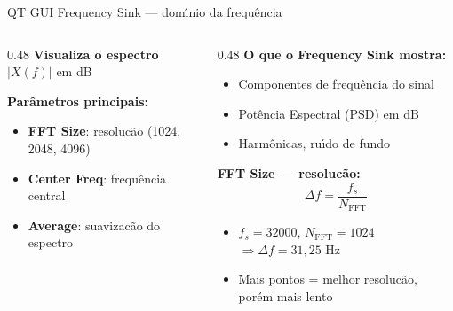 \documentclass[aspectratio=169]{beamer}
\begin{document}
\begin{frame}{QT GUI Frequency Sink --- dom\'{\i}nio da frequ\^{e}ncia}
\begin{columns}
\begin{column}{0.48\textwidth}
  \textbf{Visualiza o espectro} $|X(f)|$ em dB


  \vspace{0.1cm}

  \textbf{Par\^{a}metros principais:}
  \begin{itemize}\setlength{\itemsep}{1pt}
    \item \textbf{FFT Size}: resoluc\~{a}o (1024, 2048, 4096)
    \item \textbf{Center Freq}: frequ\^{e}ncia central
    \item \textbf{Average}: suavizac\~{a}o do espectro
  \end{itemize}
\end{column}
\begin{column}{0.48\textwidth}
  \textbf{O que o Frequency Sink mostra:}
  \begin{itemize}\setlength{\itemsep}{1pt}
    \item Componentes de frequ\^{e}ncia do sinal
    \item Pot\^{e}ncia Espectral (PSD) em dB
    \item Harm\^{o}nicas, ru\'{\i}do de fundo
  \end{itemize}

  \vspace{0.15cm}

  \textbf{FFT Size --- resoluc\~{a}o:}
  \vspace{-0.2cm}
  \[\Delta f = \frac{f_s}{N_{\text{FFT}}}\]
  \vspace{-0.3cm}

  \begin{itemize}\setlength{\itemsep}{1pt}
    \item $f_s = 32000$, $N_{\text{FFT}} = 1024$
      $\Rightarrow \Delta f = 31{,}25$ Hz
    \item Mais pontos = melhor resoluc\~{a}o, por\'{e}m mais lento
  \end{itemize}
\end{column}
\end{columns}
\end{frame}
\end{document}
